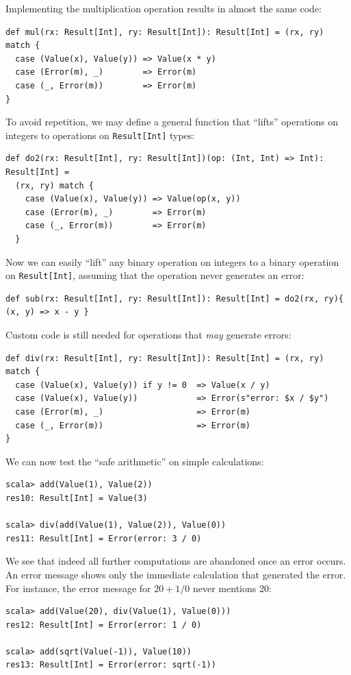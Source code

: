 Implementing the multiplication operation results in almost the same
code:
\begin{lstlisting}
def mul(rx: Result[Int], ry: Result[Int]): Result[Int] = (rx, ry) match {
  case (Value(x), Value(y)) => Value(x * y)
  case (Error(m), _)        => Error(m)
  case (_, Error(m))        => Error(m)
}
\end{lstlisting}
To avoid repetition, we may define a general function that ``lifts''
operations on integers to operations on \lstinline!Result[Int]! types:
\begin{lstlisting}
def do2(rx: Result[Int], ry: Result[Int])(op: (Int, Int) => Int): Result[Int] =
  (rx, ry) match {
    case (Value(x), Value(y)) => Value(op(x, y))
    case (Error(m), _)        => Error(m)
    case (_, Error(m))        => Error(m)
  }
\end{lstlisting}
Now we can easily ``lift'' any binary operation on integers to a
binary operation on \lstinline!Result[Int]!, assuming that the operation
never generates an error:
\begin{lstlisting}
def sub(rx: Result[Int], ry: Result[Int]): Result[Int] = do2(rx, ry){ (x, y) => x - y }
\end{lstlisting}
 Custom code is still needed for operations that \emph{may} generate
errors:
\begin{lstlisting}
def div(rx: Result[Int], ry: Result[Int]): Result[Int] = (rx, ry) match {
  case (Value(x), Value(y)) if y != 0  => Value(x / y)
  case (Value(x), Value(y))            => Error(s"error: $x / $y")
  case (Error(m), _)                   => Error(m)
  case (_, Error(m))                   => Error(m)
}
\end{lstlisting}
We can now test the ``safe arithmetic'' on simple calculations:
\begin{lstlisting}
scala> add(Value(1), Value(2))
res10: Result[Int] = Value(3)

scala> div(add(Value(1), Value(2)), Value(0))
res11: Result[Int] = Error(error: 3 / 0)
\end{lstlisting}
We see that indeed all further computations are abandoned once an
error occurs. An error message shows only the immediate calculation
that generated the error. For instance, the error message for $20+1/0$
never mentions $20$:
\begin{lstlisting}
scala> add(Value(20), div(Value(1), Value(0)))
res12: Result[Int] = Error(error: 1 / 0)

scala> add(sqrt(Value(-1)), Value(10))
res13: Result[Int] = Error(error: sqrt(-1))
\end{lstlisting}


